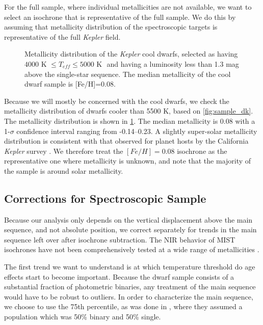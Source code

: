 \documentclass[manuscript]{aastex6}
\newcommand{\Kepler}{\mbox{\textit{Kepler}}}
\newcommand{\Teff}{\ensuremath{T_{eff}}}
\begin{document}
For the full \citet{McQuillan14} sample, where individual metallicities are not
available, we want to select an isochrone that is representative of the full 
sample. We do this by assuming that metallicity distribution of the 
spectroscopic targets is representative of the full \Kepler{} field. 

\begin{figure}[htb]
    \centering
    \caption{Metallicity distribution of the \Kepler{} cool dwarfs, selected as
        having \(4000 \textrm{ K } \le \Teff \le 5000 \textrm{ K }\) and having
        a luminosity less than 1.3 mag above the single-star sequence. The 
        median metallicity of the cool dwarf sample is [Fe/H]=0.08.}
    \label{fig:metallicity}
\end{figure}

Because we will mostly be concerned with the cool dwarfs, we check the
metallicity distribution of dwarfs cooler than 5500 K, based on 
\cref{fig:sample_dk}. The metallicity distribution is shown in
\cref{fig:metallicity}. The median metallicity is 0.08 with a 1-\(\sigma\)
confidence interval ranging from -0.14--0.23. A slightly super-solar
metallicity distribution is consistent with that observed for planet hosts by 
the California \Kepler{} survey \citep{Petigura17}.  We therefore treat the \([Fe/H] =
0.08\) isochrone as the representative one where metallicity is unknown, and
note that the majority of the sample is around solar metallicity.

\subsection{Corrections for Spectroscopic Sample}

Because our analysis only depends on the vertical displacement above the main
sequence, and not absolute position, we correct separately for trends in the
main sequence left over after isochrone subtraction. The NIR behavior of MIST 
isochrones have not been comprehensively tested at a wide range of 
metallicities \citep{Choi18}.

The first trend we want to understand is at which temperature threshold do age
effects start to become important. Because the dwarf sample consists of a
substantial fraction of photometric binaries, any treatment of the main
sequence would have to be robust to outliers. In order to characterize the main
sequence, we choose to use the 75th percentile, as was done in
\citep{Mermillod92}, where they assumed a population which was 50\% binary and
50\% single. 
\end{document}
